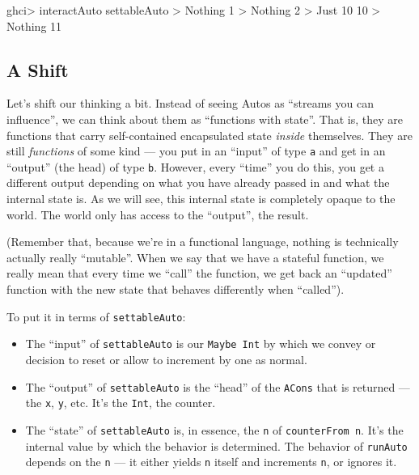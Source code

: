 \documentclass[]{article}
\newenvironment{Shaded}{}{}
\newcommand{\DataTypeTok}[1]{\textcolor[rgb]{0.56,0.13,0.00}{{#1}}}
\newcommand{\DecValTok}[1]{\textcolor[rgb]{0.25,0.63,0.44}{{#1}}}
\newcommand{\FunctionTok}[1]{\textcolor[rgb]{0.02,0.16,0.49}{{#1}}}
\newcommand{\NormalTok}[1]{{#1}}
\begin{document}
\begin{Shaded}
\begin{Highlighting}[]
\NormalTok{ghci}\FunctionTok{>} \NormalTok{interactAuto settableAuto}
\FunctionTok{>} \DataTypeTok{Nothing}
\DecValTok{1}
\FunctionTok{>} \DataTypeTok{Nothing}
\DecValTok{2}
\FunctionTok{>} \DataTypeTok{Just} \DecValTok{10}
\DecValTok{10}
\FunctionTok{>} \DataTypeTok{Nothing}
\DecValTok{11}
\end{Highlighting}
\end{Shaded}

\subsection{A Shift}\label{a-shift}

Let's shift our thinking a bit. Instead of seeing Autos as ``streams you can
influence'', we can think about them as ``functions with state''. That is, they
are functions that carry self-contained encapsulated state \emph{inside}
themselves. They are still \emph{functions} of some kind --- you put in an
``input'' of type \texttt{a} and get in an ``output'' (the head) of type
\texttt{b}. However, every ``time'' you do this, you get a different output
depending on what you have already passed in and what the internal state is. As
we will see, this internal state is completely opaque to the world. The world
only has access to the ``output'', the result.

(Remember that, because we're in a functional language, nothing is technically
actually really ``mutable''. When we say that we have a stateful function, we
really mean that every time we ``call'' the function, we get back an ``updated''
function with the new state that behaves differently when ``called'').

To put it in terms of \texttt{settableAuto}:

\begin{itemize}
\tightlist
\item
  The ``input'' of \texttt{settableAuto} is our \texttt{Maybe\ Int} by which we
  convey or decision to reset or allow to increment by one as normal.
\item
  The ``output'' of \texttt{settableAuto} is the ``head'' of the \texttt{ACons}
  that is returned --- the \texttt{x}, \texttt{y}, etc. It's the \texttt{Int},
  the counter.
\item
  The ``state'' of \texttt{settableAuto} is, in essence, the \texttt{n} of
  \texttt{counterFrom\ n}. It's the internal value by which the behavior is
  determined. The behavior of \texttt{runAuto} depends on the \texttt{n} --- it
  either yields \texttt{n} itself and increments \texttt{n}, or ignores it.
\end{itemize}
\end{document}
